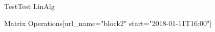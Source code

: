 \documentclass[12pt]{article}
\begin{document}
\begin{edXcourse}{Test}{Test LinAlg}
\begin{edXchapter}{Matrix Operations}[url_name="block2" start="2018-01-11T16:00"]




% 

% 











% 

% 






\end{edXchapter}



\end{edXcourse}
\end{document}
